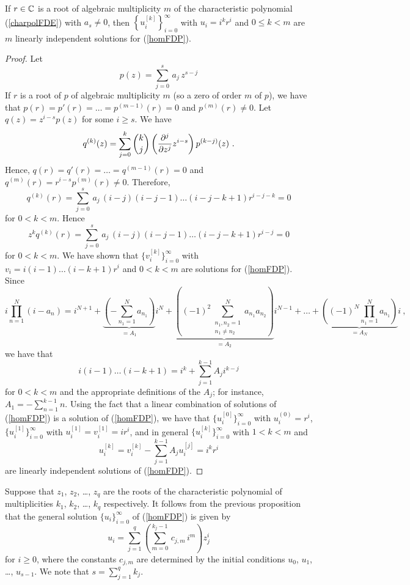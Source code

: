 \begin{prop}
If $r \in \CC$ is a root of algebraic multiplicity $m$ of the
characteristic polynomial (\ref{charpolFDE}) with $a_s \neq 0$, then
$\displaystyle \left\{ u_i^{[k]} \right\}_{i=0}^\infty$
with $u_i = i^kr^i$ and $0\leq k <m$
are $m$ linearly independent solutions for (\ref{homFDP}).
\label{rootHO}
\end{prop}

\begin{proof}
Let
\[
p(z) = \sum_{j=0}^s \,a_j \, z^{s-j}
\]
If $r$ is a root of $p$ of algebraic multiplicity $m$ (so a zero of
order $m$ of $p$), we have that
$p(r) = p'(r) = \ldots = p^{(m-1)}(r) = 0$ and $p^{(m)}(r) \neq 0$.
Let $q(z) = z^{i-s}p(z)$ for some $i \geq s$.  We have
\[
  q^{(k)}(z) = \sum_{j=0}^k \binom{k}{j}\left(\pdfdxn{z^{i-s}}{z}{j}\right)
  p^{(k-j)}(z) \ .
\]
Hence, $q(r) = q'(r) = \ldots = q^{(m-1)}(r) = 0$
and $q^{(m)}(r) = r^{i-s} p^{(m)}(r) \neq 0$.  Therefore,
\[
  q^{(k)}(r) = \sum_{j=0}^s \,a_j \, (i-j)(i-j-1)\ldots(i-j-k+1)r^{i-j-k}
  = 0
\]
for $0<k<m$.  Hence
\[
 z^k q^{(k)}(r) = \sum_{j=0}^s \,a_j \, (i-j)(i-j-1)\ldots(i-j-k+1)r^{i-j}
  = 0
\]
for $0<k<m$.  We have shown that
$\{ v_i^{[k]} \}_{i=0}^\infty$ with $v_i = i(i-1)\ldots(i-k+1)r^i$ and
$0 < k <m$ are solutions for (\ref{homFDP}).  Since
\[
i \prod_{n=1}^N (i - a_n)
= i^{N+1} + \underbrace{\left(-\sum_{n_1=1}^N a_{n_1}\right)}_{=A_1}  i^N
+ \underbrace{\left( (-1)^2 \sum_{\substack{n_1,n_2=1 \\ n_1 \neq n_2}}^N
a_{n_1}a_{n_2}\right)}_{=A_2} i^{N-1}  + \ldots
+ \underbrace{\left( (-1)^N\prod_{n_1=1}^N a_{n_1}\right)}_{=A_N} i \ ,
\]
we have that
\[
i(i-1)\ldots(i-k+1) = i^k + \sum_{j=1}^{k-1}A_j i^{k-j}
\]
for $0<k<m$ and the appropriate definitions of the $A_j$; for
instance, $\displaystyle A_1 = - \sum_{n=1}^{k-1} n$.
Using the fact that a linear combination of solutions of
(\ref{homFDP}) is a solution of (\ref{homFDP}), we have that
$\{ u_i^{[0]} \}_{i=0}^\infty$ with $u_i^{(0)} = r^i$,
$\{ u_i^{[1]} \}_{i=0}^\infty$ with $u_i^{[1]} = v_i^{[1]} = i r^i$,
and in general
$\{ u_i^{[k]} \}_{i=0}^\infty$ with $1<k<m$ and
\[
u_i^{[k]} = v_i^{[k]} - \sum_{j=1}^{k-1} A_j u_i^{[j]} = i^k r^i
\]
are linearly independent solutions of (\ref{homFDP}).
\end{proof}

Suppose that $z_1$, $z_2$, \ldots, $z_q$ are the
roots of the characteristic polynomial of multiplicities $k_1$, $k_2$,
\ldots, $k_q$ respectively.  It follows from the previous proposition
that the general solution
$\{ u_i \}_{i=0}^\infty$ of (\ref{homFDP}) is given by
\[
u_i = \sum_{j=1}^q \left( \sum_{m=0}^{k_j-1}\,c_{j,m}\,i^m \right) z_j^i 
\]
for $i \geq 0$, where the constants $c_{j,m}$ are determined by the
initial conditions $u_0$, $u_1$, \ldots, $u_{s-1}$.  We note that
$\displaystyle s = \sum_{j=1}^q k_j$.

